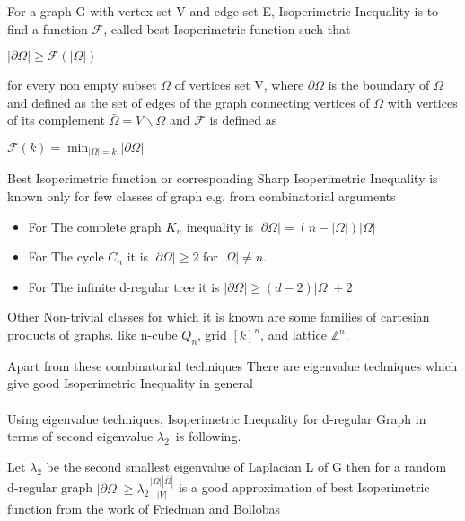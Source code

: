 \documentclass[oneside]{book}
\theoremstyle{definition}
\begin{document}
For a graph G with vertex set V and edge set E, Isoperimetric Inequality is to find a function $\mathcal{F}$, called best  Isoperimetric function such that  \begin{center}
  $|\partial \Omega| \geq \mathcal{F}(|\Omega|)$  
\end{center}   
for every non empty subset $\Omega$ of vertices set V, where $\partial \Omega$ is the boundary of $\Omega$  and defined as the set of edges of the graph connecting vertices of $\Omega$ with vertices of its complement $\bar{\Omega} = V \backslash \Omega $ and $\mathcal{F}$ is defined as  \begin{center}
    $\mathscr{F}(k)=\min _{|\Omega|=k}|\partial \Omega|$\par
\end{center} 
 Best Isoperimetric function or corresponding Sharp Isoperimetric Inequality is known only for few classes of graph e.g.
from combinatorial arguments 
\par
\begin{itemize}
    \item For The complete graph $K_{n}$ inequality is $|\partial \Omega|=(n-|\Omega|) | \Omega|$ 
    \item For The cycle $C_{n}$ it is  $|\partial \Omega|\geq 2$ for $|\Omega| \neq n$.
    \item For The infinite d-regular tree it is $|\partial \Omega| \geq(d-2)| \Omega|+2$\par
\end{itemize}
 
  
     
     Other Non-trivial classes for which it is known are some families of cartesian products of graphs. like 
n-cube $Q_{n}$, 
grid $[k]^{n}$,
and lattice $\mathbb{Z}^{n}$.
\par
 Apart from these combinatorial techniques There are eigenvalue techniques which give good Isoperimetric Inequality in general \\\\
 
 Using eigenvalue techniques, 
 Isoperimetric Inequality for d-regular Graph in terms of second eigenvalue $\lambda_2$\ is following. \par
  
 Let $\lambda_{2}$ be the second smallest eigenvalue of Laplacian L of G then for a random d-regular graph $|\partial \Omega| \geq \lambda_{2} \frac{|\Omega||\bar{\Omega}|}{|V|}$  is a good approximation of best Isoperimetric function from the work of Friedman and Bollobas  \par 
     
\end{document}
